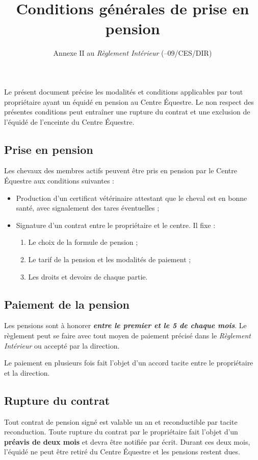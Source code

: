 \documentclass[11pt,a4paper]{article}
\title[Conditions générales de prise en pension\\ version du \today]{Conditions générales de prise en pension}
\subtitle{Annexe II au \textit{Règlement Intérieur} (\no 24--09/CES/DIR)}
\author{}
\date{}
\renewcommand{\emph}[1]{\textit{\textbf{#1}}}
\begin{document}
\maketitle


Le présent document précise les modalités et conditions applicables par tout propriétaire ayant un équidé en pension au Centre Équestre.
Le non respect des présentes conditions peut entraîner une rupture du contrat et une exclusion de l'équidé de l'enceinte du Centre Équestre.

\subsection*{Prise en pension}
Les chevaux des membres actifs peuvent être pris en pension par le Centre Équestre aux conditions suivantes :
\begin{itemize}
\item
Production d'un certificat vétérinaire attestant que le cheval est en bonne santé, avec signalement des tares éventuelles ;
\item
Signature d'un contrat entre le propriétaire et le centre.
Il fixe :
\begin{enumerate}
\item
Le choix de la formule de pension ;
\item
Le tarif de la pension et les modalités de paiement ;
\item
Les droits et devoirs de chaque partie.
\end{enumerate}
\end{itemize}

\subsection*{Paiement de la pension}
Les pensions sont à honorer \emph{entre le premier et le 5 de chaque mois}.
Le règlement peut se faire avec tout moyen de paiement précisé dans le \textit{Règlement Intérieur} ou accepté par la direction.

Le paiement en plusieurs fois fait l'objet d'un accord tacite entre le propriétaire et la direction.

\subsection*{Rupture du contrat}
Tout contrat de pension signé est valable un an et reconductible par tacite reconduction.
Toute rupture du contrat par le propriétaire fait l'objet d'un \textbf{préavis de deux mois} et devra être notifiée par écrit.
Durant ces deux mois, l'équidé ne peut être retiré du Centre Équestre et les pensions restent dues.
\end{document}
